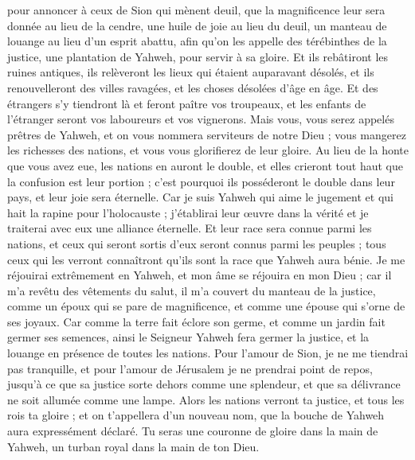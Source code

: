 \begin{multicols}{2}
pour annoncer à ceux de Sion qui mènent deuil, que la magnificence leur sera donnée au lieu de la cendre, une huile de joie au lieu du deuil, un manteau de louange au lieu d'un esprit abattu, afin qu'on les appelle des térébinthes de la justice, une plantation de Yahweh, pour servir à sa gloire.
Et ils rebâtiront les ruines antiques, ils relèveront les lieux qui étaient auparavant désolés, et ils renouvelleront des villes ravagées, et les choses désolées d'âge en âge.
Et des étrangers s'y tiendront là et feront paître vos troupeaux, et les enfants de l'étranger seront vos laboureurs et vos vignerons.
Mais vous, vous serez appelés prêtres de Yahweh, et on vous nommera serviteurs de notre Dieu ; vous mangerez les richesses des nations, et vous vous glorifierez de leur gloire.
Au lieu de la honte que vous avez eue, les nations en auront le double, et elles crieront tout haut que la confusion est leur portion ; c'est pourquoi ils posséderont le double dans leur pays, et leur joie sera éternelle.
Car je suis Yahweh qui aime le jugement et qui hait la rapine pour l'holocauste ; j'établirai leur œuvre dans la vérité et je traiterai avec eux une alliance éternelle.
Et leur race sera connue parmi les nations, et ceux qui seront sortis d'eux seront connus parmi les peuples ; tous ceux qui les verront connaîtront qu'ils sont la race que Yahweh aura bénie.
Je me réjouirai extrêmement en Yahweh, et mon âme se réjouira en mon Dieu ; car il m'a revêtu des vêtements du salut, il m'a couvert du manteau de la justice, comme un époux qui se pare de magnificence, et comme une épouse qui s'orne de ses joyaux.
Car comme la terre fait éclore son germe, et comme un jardin fait germer ses semences, ainsi le Seigneur Yahweh fera germer la justice, et la louange en présence de toutes les nations.
\VerseOne{}Pour l'amour de Sion, je ne me tiendrai pas tranquille, et pour l'amour de Jérusalem je ne prendrai point de repos, jusqu'à ce que sa justice sorte dehors comme une splendeur, et que sa délivrance ne soit allumée comme une lampe.
Alors les nations verront ta justice, et tous les rois ta gloire ; et on t'appellera d'un nouveau nom, que la bouche de Yahweh aura expressément déclaré.
Tu seras une couronne de gloire dans la main de Yahweh, un turban royal dans la main de ton Dieu.

\end{multicols}
